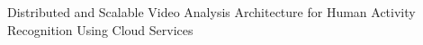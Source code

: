 Distributed and Scalable Video Analysis Architecture
for Human Activity Recognition Using Cloud Services
